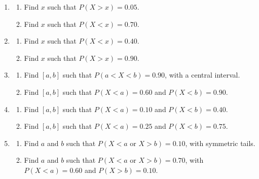 \begin{enumerate}[label=\textbf{\arabic*)}]
		\item {}
		\begin{enumerate}[label=\textbf{\alph*)}]
			\item Find \(x\) such that \(P(X>x)=0.05\).
			\item Find \(x\) such that \(P(X<x)=0.70\).
		\end{enumerate}
		
		\item {}
		\begin{enumerate}[label=\textbf{\alph*)}]
			\item Find \(x\) such that \(P(X<x)=0.40\).
			\item Find \(x\) such that \(P(X>x)=0.90\).
		\end{enumerate}
		
		\item {}
		\begin{enumerate}[label=\textbf{\alph*)}]
			\item Find \([a,b]\) such that \(P(a<X<b)=0.90\), with a central interval.
			\item Find \([a,b]\) such that \(P(X<a)=0.60\) and \(P(X<b)=0.90\).
		\end{enumerate}
		
		\item {}
		\begin{enumerate}[label=\textbf{\alph*)}]
			\item Find \([a,b]\) such that \(P(X<a)=0.10\) and \(P(X<b)=0.40\).
			\item Find \([a,b]\) such that \(P(X<a)=0.25\) and \(P(X<b)=0.75\).
		\end{enumerate}
		
		\item {}
		\begin{enumerate}[label=\textbf{\alph*)}]
			\item Find \(a\) and \(b\) such that \(P(X<a\text{ or }X>b)=0.10\), with symmetric tails.
			\item Find \(a\) and \(b\) such that \(P(X<a\text{ or }X>b)=0.70\), with \(P(X<a)=0.60\) and \(P(X>b)=0.10\).
		\end{enumerate}
		

\end{enumerate}
